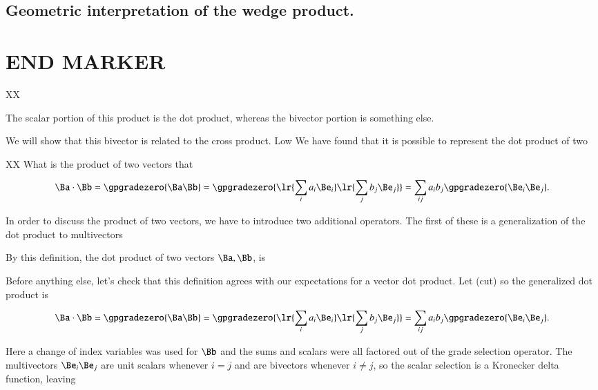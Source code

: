 
\subsection{Geometric interpretation of the wedge product.}

\section{END MARKER}

XX

The scalar portion of this product is the dot product, whereas the bivector portion is something else.


We will show that this bivector is related to the  cross product.
Low
We have found that it is possible to represent the dot product of two

XX
What is the product of two vectors that

\begin{dmath}\label{eqn:SimpleProducts2:1180}
\Ba \cdot \Bb
=
\gpgradezero{ \Ba \Bb }
=
\gpgradezero{ \lr{ \sum_i a_i \Be_i }
\lr{ \sum_j b_j \Be_j }
}
=
\sum_{ij} a_i b_j \gpgradezero{ \Be_i \Be_j }.
\end{dmath}


In order to discuss the product of two vectors, we have to introduce two additional operators.  The first of these is a generalization of the dot product to multivectors

By this definition, the dot product of two vectors \( \Ba, \Bb \), is


Before anything else, let's check that this definition agrees with our expectations for a vector dot product.  Let
(cut)
so the generalized dot product is

\begin{dmath}\label{eqn:SimpleProducts2:1180}
\Ba \cdot \Bb
=
\gpgradezero{ \Ba \Bb }
=
\gpgradezero{ \lr{ \sum_i a_i \Be_i }
\lr{ \sum_j b_j \Be_j }
}
=
\sum_{ij} a_i b_j \gpgradezero{ \Be_i \Be_j }.
\end{dmath}

Here a change of index variables was used for \( \Bb \) and the sums and scalars were all factored out of the grade selection operator.  The multivectors \( \Be_i \Be_j \) are unit scalars whenever \( i = j \) and are bivectors whenever \( i \ne j \), so the scalar selection is a Kronecker delta function, leaving

